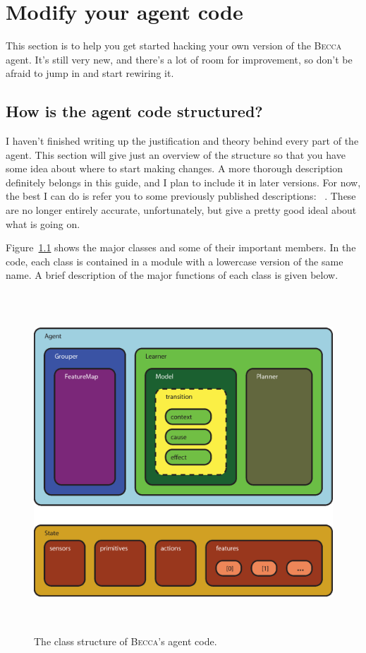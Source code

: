 \chapter{Modify your agent code}

This section is to help you get started hacking your own version of the \textsc{Becca} agent. It's still very new, and there's a lot of room for improvement, so don't be afraid to jump in and start rewiring it.

\section{How is the agent code structured?}

I haven't finished writing up the justification and theory behind every part of the agent. This section will give just an overview of the structure so that you have some idea about where to start making changes. A more thorough description definitely belongs in this guide, and I plan to include it in later versions. For now, the best I can do is refer you to some previously published descriptions: ~\cite{rohrer11b,rohrer11c}. These are no longer entirely accurate, unfortunately, but give a pretty good ideal about what is going on.

Figure~\ref{class_structure} shows the major classes and some of their important members. In the code, each class is contained in a module with a lowercase version of the same name. A brief description of the major functions of each class is given below.

\begin{figure}
\centering
\includegraphics[height=12.7cm]{figs/class_structure.eps}
\caption{The class structure of \textsc{Becca}'s agent code.}
\label{class_structure}
\end{figure}

